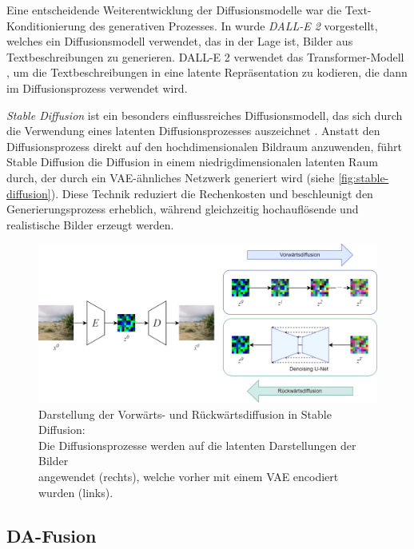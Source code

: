 Eine entscheidende Weiterentwicklung der Diffusionsmodelle war die Text-Konditionierung des generativen Prozesses. In \parencite{Ramesh2022dalle2} wurde \emph{DALL-E 2} vorgestellt, welches ein Diffusionsmodell verwendet, das in der Lage ist, Bilder aus Textbeschreibungen zu generieren. DALL-E 2 verwendet das Transformer-Modell \parencite{Vaswani2017transformer}, um die Textbeschreibungen in eine latente Repräsentation zu kodieren, die dann im Diffusionsprozess verwendet wird.

\emph{Stable Diffusion} ist ein besonders einflussreiches Diffusionsmodell, das sich durch die Verwendung eines latenten Diffusionsprozesses auszeichnet \parencite{Rombach2022stablediffusion}. Anstatt den Diffusionsprozess direkt auf den hochdimensionalen Bildraum anzuwenden, führt Stable Diffusion die Diffusion in einem niedrigdimensionalen latenten Raum durch, der durch ein VAE-ähnliches Netzwerk generiert wird (siehe \autoref{fig:stable-diffusion}). Diese Technik reduziert die Rechenkosten und beschleunigt den Generierungsprozess erheblich, während gleichzeitig hochauflösende und realistische Bilder erzeugt werden.

\begin{figure}[t]
	\centering
	\includegraphics[width=\textwidth]{figure_diffusion_merged_custom.png}
	\caption[Darstellung der Vorwärts- und Rückwärtsdiffusion in Stable Diffusion.]{Darstellung der Vorwärts- und Rückwärtsdiffusion in Stable Diffusion:\\
		Die	Diffusionsprozesse werden auf die latenten Darstellungen der Bilder\\
		angewendet (rechts), welche vorher mit einem VAE encodiert wurden (links).}
	\label{fig:stable-diffusion}
\end{figure}


\subsection{DA-Fusion} \label{subsec:da-fusion}


